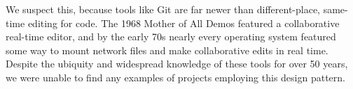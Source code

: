 \documentclass[sigconf,authorversion,nonacm]{acmart}
\begin{document}
We suspect this, because tools like Git are far newer than different-place, same-time editing for code.
The 1968 Mother of All Demos featured a collaborative real-time editor, and by the early 70s nearly every operating system featured some way to mount network files and make collaborative edits in real time.
Despite the ubiquity and widespread knowledge of these tools for over 50 years, we were unable to find any examples of projects employing this design pattern.


\end{document}
